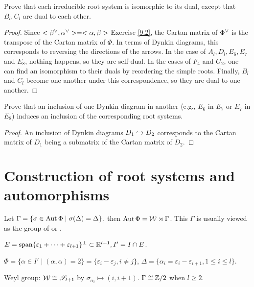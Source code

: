 \begin{ex}
  Prove that each irreducible root system is isomorphic to its dual, except that $B_l, C_l$ are dual to each other.
\end{ex}
\begin{proof}
  Since $<{\beta}^{\vee},{\alpha}^{\vee}> = <\alpha,\beta>$ Exercise \ref{9.2}, the Cartan matrix of ${\Phi}^{\vee}$ is the transpose of the Cartan matrix of $\Phi$. In terms of Dynkin diagrams, this corresponds to reversing the directions of the arrows. In the case of $A_l, D_l, E_6, E_7$ and $E_8$, nothing happens, so they are self-dual. In the cases of $F_4$ and $G_2$, one can find an isomorphism to their duals by reordering the simple roots. Finally, $B_l$ and $C_l$ become one another under this correspondence, so they are dual to one another.
\end{proof}

\begin{ex}
  Prove that an inclusion of one Dynkin diagram in another (e.g., $E_6$ in $E_7$ or $E_7$ in $E_8$) induces an inclusion of the corresponding root systems.
\end{ex}
\begin{proof}
  An inclusion of Dynkin diagrams $D_1\hookrightarrow D_2$ corresponds to the Cartan matrix of $D_1$ being a submatrix of the Cartan matrix of $D_2$.
\end{proof}

\section{Construction of root systems and automorphisms}

\begin{defn}
  Let $\Gamma=\{\sigma\in\operatorname{Aut}\Phi\mid\sigma(\Delta)=\Delta\}$, then $\operatorname{Aut}\Phi={\cal W}\rtimes\Gamma$. This $\Gamma$ is usually viewed as the group of  or .
\end{defn}

\begin{exam}[$A_l(l\geqslant1)$]
  $E=\operatorname{span}\{\varepsilon_1+\cdots+\varepsilon_{l+1}\}^{\perp}\subset{\mathbb R}^{l+1}, I'=I\cap E$.

  $\Phi=\{\alpha\in I'\mid (\alpha,\alpha)=2\}=\{\varepsilon_i-\varepsilon_j, i\neq j\}$,
  $\Delta=\{\alpha_i=\varepsilon_i-\varepsilon_{i+1}, 1\leqslant i\leqslant l\}$.

  Weyl group: ${\cal W}\cong\mathscr{S}_{l+1}$ by $\sigma_{\alpha_i}\mapsto(i,i+1)$. $\Gamma\cong{\mathbb Z}/2$ when $l\geqslant2$.
\end{exam}

